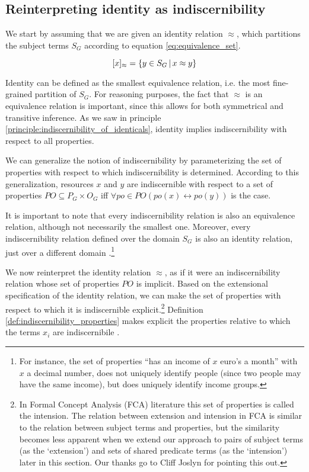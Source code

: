 \subsection{Reinterpreting identity as indiscernibility}

We start by assuming that we are given an identity relation $\approx$,
  which partitions the subject terms $S_G$ according to
  \mbox{equation} \ref{eq:equivalence_set}.

\begin{equation}
\label{eq:equivalence_set}
  [x]_{\approx}
=
  \{
    y \in S_G
  \,\vert\,
    x \approx y
  \}
\end{equation}

\noindent Identity can be defined as the smallest equivalence relation,
  i.e. the most fine-grained partition of $S_G$.
For reasoning purposes, the fact that $\approx$ is an equivalence relation
  is important, since this allows for both symmetrical
  and transitive inference.
As we saw in principle \ref{principle:indiscernibility_of_identicals},
  identity implies indiscernibility with respect to all properties.

We can generalize the notion of indiscernibility
  by parameterizing the set of properties with respect to which
  indiscernibility is determined.
According to this generalization,
  resources $x$ and $y$ are indiscernible with respect to
  a set of properties $PO \subseteq P_G \times O_G$
  iff $\forall po \in PO (po(x) \leftrightarrow po(y))$ is the case.

It is important to note that every indiscernibility relation
  is also an equivalence relation, although not necessarily the smallest one.
Moreover, every indiscernibility relation defined over the domain $S_G$
  is also an identity relation,
  just over a different domain \cite{Quine1950}.\footnote{
    For instance, the set of properties
      ``has an income of $x$ euro's a month''
      with $x$ a decimal number, does not uniquely identify people
      (since two people may have the same income),
      but does uniquely identify income groups.
    }

We now reinterpret the identity relation $\approx$,
  as if it were an indiscernibility relation
  whose set of properties $PO$ is implicit.
Based on the extensional specification of the identity relation,
  we can make the set of properties with respect to which
  it is indiscernible explicit.\footnote{
    In Formal Concept Analysis (FCA) literature this set of properties
    is called the intension. The relation between extension and intension
    in FCA is similar to the relation between subject terms and properties,
    but the similarity becomes less apparent when we extend our approach
    to pairs of subject terms (as the `extension') and sets of
    shared predicate terms (as the `intension') later in this section.
    Our thanks go to Cliff Joslyn for pointing this out.
  }
Definition \ref{def:indiscernibility_properties} makes explicit
  the properties relative to which the terms $x_i$ are indiscernibile
  .

